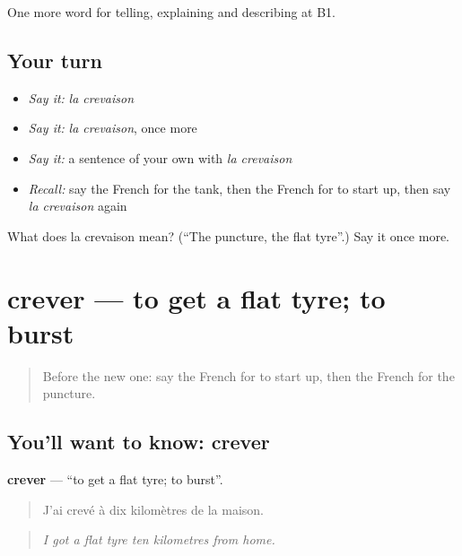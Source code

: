 \begin{grammarlens}[title={What you've built}]
One more word for telling, explaining and describing at B1.
\end{grammarlens}

\subsection*{Your turn}
\begin{itemize}
\raggedright
  \item \emph{Say it:} \emph{la crevaison}
  \item \emph{Say it:} \emph{la crevaison}, once more
  \item \emph{Say it:} a sentence of your own with \emph{la crevaison}
  \item \emph{Recall:} say the French for the tank, then the French for to start up, then say \emph{la crevaison} again
\end{itemize}

\begin{tcolorbox}[breakable,colback=teal!4,colframe=teal!35!black,title={Before you move on}]
What does la crevaison mean? (\textquotedblleft{}The puncture, the flat tyre\textquotedblright{}.) Say it once more.
\end{tcolorbox}
\section[crever]{crever — to get a flat tyre; to burst}

\label{lesson:FR-C404-crever}



\begin{quote}
Before the new one: say the French for to start up, then the French for the puncture.
\end{quote}

\subsection*{You'll want to know: crever}
\textbf{crever} — \textquotedblleft{}to get a flat tyre; to burst\textquotedblright{}.

\begin{quote}
J'ai crevé à dix kilomètres de la maison.
\end{quote}

\begin{quote}
\emph{I got a flat tyre ten kilometres from home.}
\end{quote}

